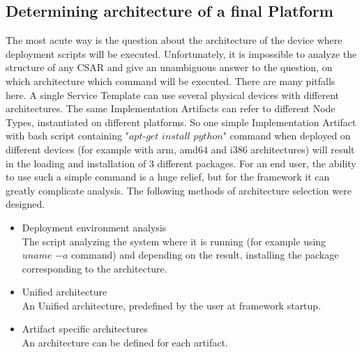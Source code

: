 \subsection{Determining architecture of a final Platform}
The most acute way is the question about the architecture of the device where deployment scripts will be executed.
Unfortunately, it is impossible to analyze the structure of any CSAR and give an unambiguous answer to the question, on which architecture which command will be executed.
There are many pitfalls here.
A single Service Template can use several physical devices with different architectures.
The same Implementation Artifacts can refer to different Node Types, instantiated on different platforms.
So one simple Implementation Artifact with bash script containing "$apt$-$get$ $install$ $python$" command when deployed on different devices (for example with arm, amd64 and i386 architectures) will result in the loading and installation of 3 different packages. 
For an end user, the ability to use such a simple command is a huge relief, but for the framework it can greatly complicate analysis.
The following methods of architecture selection were designed.
\begin{itemize}
	\item Deployment environment analysis\\
	The script analyzing the system where it is running (for example using $uname$ $-a$ command) and depending on the result, installing the package corresponding to the architecture.
	\item Unified architecture\\
	An Unified architecture, predefined by the user at framework startup.
	\item Artifact specific architectures\\
	An architecture can be defined for each artifact.
\end{itemize}
